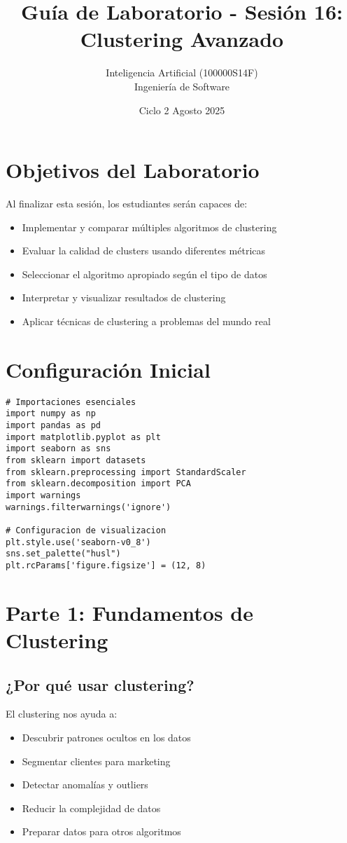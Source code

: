 \documentclass[12pt]{article}
\title{Guía de Laboratorio - Sesión 16: Clustering Avanzado}
\author{Inteligencia Artificial (100000S14F) \\ Ingeniería de Software}
\date{Ciclo 2 Agosto 2025}
\begin{document}
\maketitle

\section*{Objetivos del Laboratorio}
Al finalizar esta sesión, los estudiantes serán capaces de:
\begin{itemize}
    \item Implementar y comparar múltiples algoritmos de clustering
    \item Evaluar la calidad de clusters usando diferentes métricas
    \item Seleccionar el algoritmo apropiado según el tipo de datos
    \item Interpretar y visualizar resultados de clustering
    \item Aplicar técnicas de clustering a problemas del mundo real
\end{itemize}

\section{Configuración Inicial}

\begin{lstlisting}
# Importaciones esenciales
import numpy as np
import pandas as pd
import matplotlib.pyplot as plt
import seaborn as sns
from sklearn import datasets
from sklearn.preprocessing import StandardScaler
from sklearn.decomposition import PCA
import warnings
warnings.filterwarnings('ignore')

# Configuracion de visualizacion
plt.style.use('seaborn-v0_8')
sns.set_palette("husl")
plt.rcParams['figure.figsize'] = (12, 8)
\end{lstlisting}

\section{Parte 1: Fundamentos de Clustering}

\subsection{¿Por qué usar clustering?}
El clustering nos ayuda a:
\begin{itemize}
    \item Descubrir patrones ocultos en los datos
    \item Segmentar clientes para marketing
    \item Detectar anomalías y outliers
    \item Reducir la complejidad de datos
    \item Preparar datos para otros algoritmos
\end{itemize}
\end{document}

